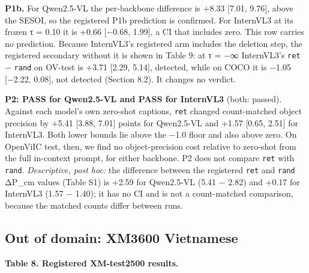 \documentclass[manuscript,screen]{acmart}
\begin{document}
\textbf{P1b.} For Qwen2.5-VL the per-backbone difference is +8.33 {[}7.01, 9.76{]}, above the SESOI,
so the registered P1b prediction is confirmed. For InternVL3 at its frozen τ = 0.10 it is +0.66
{[}−0.68, 1.99{]}, a CI that includes zero. This row carries no prediction. Because InternVL3's
registered arm includes the deletion step, the registered secondary without it is shown in Table 9:
at τ = −∞ InternVL3's \texttt{ret} − \texttt{rand} on OV-test is +3.71 {[}2.29, 5.14{]}, detected,
while on COCO it is −1.05 {[}−2.22, 0.08{]}, not detected (Section 8.2). It changes no verdict.

\textbf{P2: PASS for Qwen2.5-VL and PASS for InternVL3} (both: passed). Against each model's own
zero-shot captions, \texttt{ret} changed count-matched object precision by +5.41 {[}3.88, 7.01{]}
points for Qwen2.5-VL and +1.57 {[}0.65, 2.51{]} for InternVL3. Both lower bounds lie above the −1.0
floor and also above zero. On OpenViIC test, then, we find no object-precision cost relative to
zero-shot from the full in-context prompt, for either backbone. P2 does not compare \texttt{ret}
with \texttt{rand}. \emph{Descriptive, post hoc:} the difference between the registered \texttt{ret}
and \texttt{rand} ΔP\_cm values (Table S1) is +2.59 for Qwen2.5-VL (5.41 − 2.82) and +0.17 for
InternVL3 (1.57 − 1.40); it has no CI and is not a count-matched comparison, because the matched
counts differ between runs.

\subsection{Out of domain: XM3600 Vietnamese}\label{out-of-domain-xm3600-vietnamese}

\textbf{Table 8. Registered XM-test2500 results.}
\end{document}
